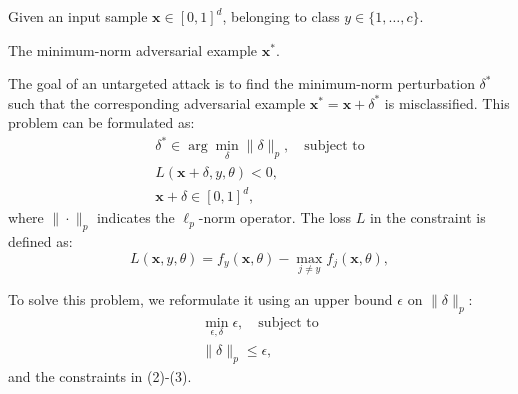 Given an input sample \( \mathbf{x} \in [0, 1]^d \), belonging to class \( y \in \{1, \ldots, c\} \).

The minimum-norm adversarial example \( \mathbf{x}^* \).

The goal of an untargeted attack is to find the minimum-norm perturbation \( \delta^* \) such that the corresponding adversarial example \( \mathbf{x}^* = \mathbf{x} + \delta^* \) is misclassified. This problem can be formulated as:
\begin{align}
\delta^* \in \arg \min_{\delta} \|\delta\|_p , \quad \text{subject to} \\
L(\mathbf{x} + \delta, y, \theta) < 0 , \\
\mathbf{x} + \delta \in [0, 1]^d ,
\end{align}
where \( \|\cdot\|_p \) indicates the \( \ell_p \)-norm operator. The loss \( L \) in the constraint is defined as:
\begin{equation}
L(\mathbf{x}, y, \theta) = f_y(\mathbf{x}, \theta) - \max_{j \neq y} f_j(\mathbf{x}, \theta) ,
\end{equation}

To solve this problem, we reformulate it using an upper bound \( \epsilon \) on \( \|\delta\|_p \):
\begin{align}
\min_{\epsilon, \delta} \epsilon , \quad \text{subject to} \\
\|\delta\|_p \leq \epsilon ,
\end{align}
and the constraints in (2)-(3).

